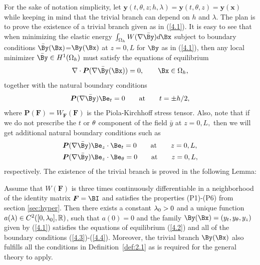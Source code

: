 For the sake of notation simplicity, let $\bm y(t,\theta,z;h,\lambda)=\bm y(t,\theta,z)=\bm y(\bm x)$ while keeping in mind that the trivial branch can depend on $h$ and $\lambda$. The plan is to prove the existence of a trivial branch given as in (\ref{4.1}). It is easy to see that when minimizing the elastic energy $\int_{\Omega_h} W(\nabla \bar \By)d\Bx$ subject to boundary conditions $\bar \By(\Bx)$=$\By(\Bx)$ at $z=0,L$ for $\By$ as in (\ref{4.1}), then any local minimizer $\bar \By\in H^1(\Omega_h)$ must satisfy the equations of equilibrium 
\begin{equation}
\label{4.2}
\nabla\cdot \bm P(\nabla \bar\By(\Bx))=0, \qquad \Bx\in \Omega_h,
\end{equation}
together with the natural boundary conditions 
\begin{equation}
\label{4.3}
\bm P(\nabla \bar\By) \Be_t=0 \qquad\text{at}\qquad t=\pm h/2,
\end{equation}
where $\boldsymbol{P}(\boldsymbol{F})=W_{\boldsymbol{F}}(\boldsymbol{F})$  is the Piola-Kirchhoff stress tensor. Also, note that if we do not prescribe the $t$ or $\theta$ component of the field $\bar y$ at $z=0,L,$ then we will get additional natural boundary conditions such as 
\begin{align}
\label{4.4}
&\bm P (\nabla\bar\By)\Be_z\cdot \Be_t=0    \qquad\text{at}\qquad z=0,L,\\ \nonumber
&\bm P (\nabla\bar\By)\Be_z\cdot \Be_\Gth=0    \qquad\text{at}\qquad z=0,L,
\end{align}
respectively. The existence of the trivial branch is proved in the following Lemma:

\begin{lemma}
\label{lem:4.1}
Assume that $W(\bm F)$ is three times continuously differentiable in a neighborhood of the identity matrix $\bm F=\BI$ and satisfies the properties (P1)-(P6) from section \ref{sec:hyper}. Then there exists a constant $\lambda_0>0$ and a unique function $a(\lambda)\in C^2([0,\lambda_0],\mathbb R)$, such that $a(0)=0$ and the family $\By(\Bx)=(y_t,y_\Gth,y_z)$ 
given by (\ref{4.1}) satisfies the equations of equilibrium (\ref{4.2}) and all of the boundary conditions (\ref{4.3})-(\ref{4.4}). Moreover, the trivial branch $\By(\Bx)$ also fulfills all the conditions in Definition~\ref{def:2.1} as is required for the general theory to apply. 

\end{lemma}


